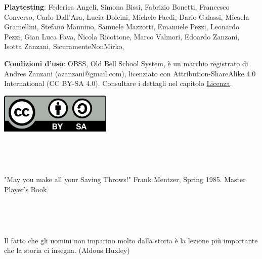 \vfill

\begin{mdframed}[roundcorner=10pt]

\medskip

\thispagestyle{empty}

\textbf{Playtesting}: Federica Angeli, Simona Bissi, Fabrizio Bonetti, Francesco Converso, Carlo Dall'Ara, Lucia Dolcini, Michele Faedi, Dario Galassi, Micaela Gramellini, Stefano Mannino, Samuele Mazzotti, Emanuele Pezzi, Leonardo Pezzi, Gian Luca Fava, Nicola Ricottone, Marco Valmori, Edoardo Zanzani, Isotta Zanzani, SicuramenteNonMirko,

\bigskip

\begin{flushleft}\textbf{Condizioni d'uso}: OBSS, Old Bell School System, è un marchio registrato di Andres Zanzani (azanzani@gmail.com), licenziato con Attribution-ShareAlike 4.0 International (CC BY-SA 4.0). Consultare i dettagli nel capitolo \hyperlink{Licenza}{Licenza}.
\end{flushleft}

\vspace{0.5cm}

\begin{center}
\includegraphics[keepaspectratio,width=0.4\textwidth]{immagini/CC_BY-SA_icon.svg.png}
\end{center}

\medskip

\end{mdframed}


\pagebreak ~

\thispagestyle{empty}

\pagebreak ~

\setcounter{page}{1}


\setcounter{page}{1}

\begin{multicols}{2}

{\small \tableofcontents{}}

\end{multicols}

\vfill

\begin{enfasi}
"May you make all your Saving Throws!" Frank Mentzer, Spring 1985. Master Player's Book
\end{enfasi}

\pagebreak~

\thispagestyle{empty}

\pagebreak~

\setcounter{page}{1}

\begin{enfasi}
Il fatto che gli uomini non imparino molto dalla storia è la lezione più importante che la storia ci insegna. (Aldous Huxley)
\end{enfasi}

